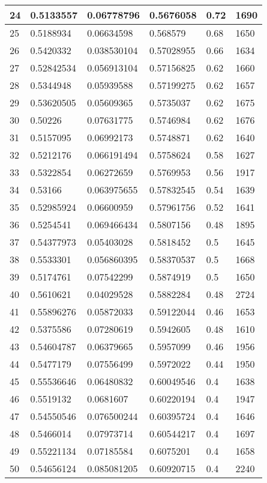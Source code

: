 \begin{longtable}{|l|l|l|l|l|l|}
24 & 0.5133557 & 0.06778796 & 0.5676058 & 0.72 & 1690 \\ \hline 
25 & 0.5188934 & 0.06634598 & 0.568579 & 0.68 & 1650 \\ \hline 
26 & 0.5420332 & 0.038530104 & 0.57028955 & 0.66 & 1634 \\ \hline 
27 & 0.52842534 & 0.056913104 & 0.57156825 & 0.62 & 1660 \\ \hline 
28 & 0.5344948 & 0.05939588 & 0.57199275 & 0.62 & 1657 \\ \hline 
29 & 0.53620505 & 0.05609365 & 0.5735037 & 0.62 & 1675 \\ \hline 
30 & 0.50226 & 0.07631775 & 0.5746984 & 0.62 & 1676 \\ \hline 
31 & 0.5157095 & 0.06992173 & 0.5748871 & 0.62 & 1640 \\ \hline 
32 & 0.5212176 & 0.066191494 & 0.5758624 & 0.58 & 1627 \\ \hline 
33 & 0.5322854 & 0.06272659 & 0.5769953 & 0.56 & 1917 \\ \hline 
34 & 0.53166 & 0.063975655 & 0.57832545 & 0.54 & 1639 \\ \hline 
35 & 0.52985924 & 0.06600959 & 0.57961756 & 0.52 & 1641 \\ \hline 
36 & 0.5254541 & 0.069466434 & 0.5807156 & 0.48 & 1895 \\ \hline 
37 & 0.54377973 & 0.05403028 & 0.5818452 & 0.5 & 1645 \\ \hline 
38 & 0.5533301 & 0.056860395 & 0.58370537 & 0.5 & 1668 \\ \hline 
39 & 0.5174761 & 0.07542299 & 0.5874919 & 0.5 & 1650 \\ \hline 
40 & 0.5610621 & 0.04029528 & 0.5882284 & 0.48 & 2724 \\ \hline 
41 & 0.55896276 & 0.05872033 & 0.59122044 & 0.46 & 1653 \\ \hline 
42 & 0.5375586 & 0.07280619 & 0.5942605 & 0.48 & 1610 \\ \hline 
43 & 0.54604787 & 0.06379665 & 0.5957099 & 0.46 & 1956 \\ \hline 
44 & 0.5477179 & 0.07556499 & 0.5972022 & 0.44 & 1950 \\ \hline 
45 & 0.55536646 & 0.06480832 & 0.60049546 & 0.4 & 1638 \\ \hline 
46 & 0.5519132 & 0.0681607 & 0.60220194 & 0.4 & 1947 \\ \hline 
47 & 0.54550546 & 0.076500244 & 0.60395724 & 0.4 & 1646 \\ \hline 
48 & 0.5466014 & 0.07973714 & 0.60544217 & 0.4 & 1697 \\ \hline 
49 & 0.55221134 & 0.07185584 & 0.6075201 & 0.4 & 1658 \\ \hline 
50 & 0.54656124 & 0.085081205 & 0.60920715 & 0.4 & 2240 \\ \hline 
\end{longtable}